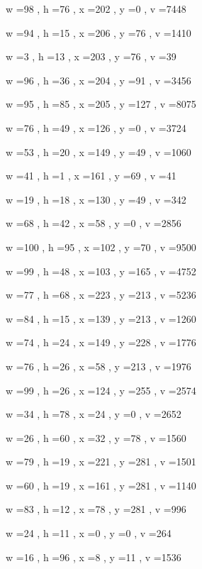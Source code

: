 \documentclass[11pt]{article}
\begin{document}
w =98 , h =76 , x =202 , y =0 , v =7448
\par
w =94 , h =15 , x =206 , y =76 , v =1410
\par
w =3 , h =13 , x =203 , y =76 , v =39
\par
w =96 , h =36 , x =204 , y =91 , v =3456
\par
w =95 , h =85 , x =205 , y =127 , v =8075
\par
w =76 , h =49 , x =126 , y =0 , v =3724
\par
w =53 , h =20 , x =149 , y =49 , v =1060
\par
w =41 , h =1 , x =161 , y =69 , v =41
\par
w =19 , h =18 , x =130 , y =49 , v =342
\par
w =68 , h =42 , x =58 , y =0 , v =2856
\par
w =100 , h =95 , x =102 , y =70 , v =9500
\par
w =99 , h =48 , x =103 , y =165 , v =4752
\par
w =77 , h =68 , x =223 , y =213 , v =5236
\par
w =84 , h =15 , x =139 , y =213 , v =1260
\par
w =74 , h =24 , x =149 , y =228 , v =1776
\par
w =76 , h =26 , x =58 , y =213 , v =1976
\par
w =99 , h =26 , x =124 , y =255 , v =2574
\par
w =34 , h =78 , x =24 , y =0 , v =2652
\par
w =26 , h =60 , x =32 , y =78 , v =1560
\par
w =79 , h =19 , x =221 , y =281 , v =1501
\par
w =60 , h =19 , x =161 , y =281 , v =1140
\par
w =83 , h =12 , x =78 , y =281 , v =996
\par
w =24 , h =11 , x =0 , y =0 , v =264
\par
w =16 , h =96 , x =8 , y =11 , v =1536
\par
\newpage


\end{document}

